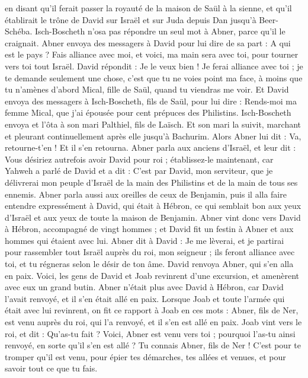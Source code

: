 \begin{multicols}{2}
en disant qu’il ferait passer la royauté de la maison de Saül à la sienne, et qu’il établirait le trône de David sur Israël et sur Juda depuis Dan jusqu'à Beer-Schéba.
Isch-Boscheth n'osa pas répondre un seul mot à Abner, parce qu'il le craignait.
Abner envoya des messagers à David pour lui dire de sa part : A qui est le pays ? Fais alliance avec moi, et voici, ma main sera avec toi, pour tourner vers toi tout Israël.
David répondit : Je le veux bien ! Je ferai alliance avec toi ; je te demande seulement une chose, c'est que tu ne voies point ma face, à moins que tu n’amènes d’abord Mical, fille de Saül, quand tu viendras me voir.
Et David envoya des messagers à Isch-Boscheth, fils de Saül, pour lui dire : Rends-moi ma femme Mical, que j'ai épousée pour cent prépuces des Philistins.
Isch-Boscheth envoya et l’ôta à son mari Palthiel, fils de Laïsch.
Et son mari la suivit, marchant et pleurant continuellement après elle jusqu'à Bachurim. Alors Abner lui dit : Va, retourne-t'en ! Et il s'en retourna.
Abner parla aux anciens d'Israël, et leur dit : Vous désiriez autrefois avoir David pour roi ;
établissez-le maintenant, car Yahweh a parlé de David et a dit : C’est par David, mon serviteur, que je délivrerai mon peuple d'Israël de la main des Philistins et de la main de tous ses ennemis.
Abner parla aussi aux oreilles de ceux de Benjamin, puis il alla faire entendre expressément à David, qui était à Hébron, ce qui semblait bon aux yeux d’Israël et aux yeux de toute la maison de Benjamin.
Abner vint donc vers David à Hébron, accompagné de vingt hommes ; et David fit un festin à Abner et aux hommes qui étaient avec lui.
Abner dit à David : Je me lèverai, et je partirai pour rassembler tout Israël auprès du roi, mon seigneur ; ils feront alliance avec toi, et tu régneras selon le désir de ton âme. David renvoya Abner, qui s'en alla en paix.
Voici, les gens de David et Joab revinrent d’une excursion, et amenèrent avec eux un grand butin. Abner n'était plus avec David à Hébron, car David l'avait renvoyé, et il s'en était allé en paix.
Lorsque Joab et toute l'armée qui était avec lui revinrent, on fit ce rapport à Joab en ces mots : Abner, fils de Ner, est venu auprès du roi, qui l'a renvoyé, et il s'en est allé en paix.
Joab vint vers le roi, et dit : Qu'as-tu fait ? Voici, Abner est venu vers toi ; pourquoi l'as-tu ainsi renvoyé, en sorte qu’il s’en est allé ?
Tu connais Abner, fils de Ner ! C’est pour te tromper qu’il est venu, pour épier tes démarches, tes allées et venues, et pour savoir tout ce que tu fais.

\end{multicols}
